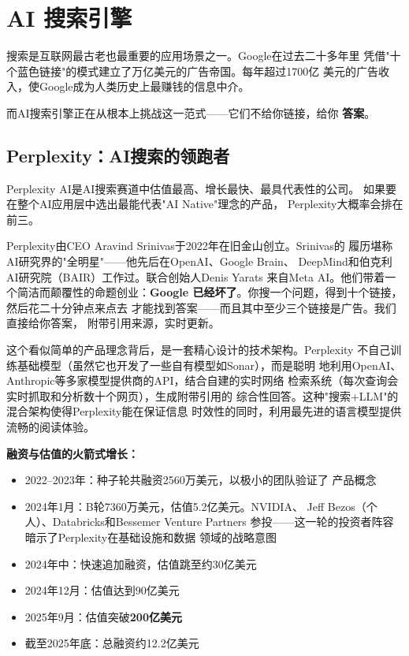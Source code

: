 \section{AI 搜索引擎}
\label{sec:social-search}

搜索是互联网最古老也最重要的应用场景之一。Google在过去二十多年里
凭借"十个蓝色链接"的模式建立了万亿美元的广告帝国。每年超过1700亿
美元的广告收入，使Google成为人类历史上最赚钱的信息中介。

而AI搜索引擎正在从根本上挑战这一范式——它们不给你链接，给你
\textbf{答案}。

\subsection{Perplexity：AI搜索的领跑者}
\label{subsec:ch09-perplexity}

Perplexity AI是AI搜索赛道中估值最高、增长最快、最具代表性的公司。
如果要在整个AI应用层中选出最能代表"AI Native"理念的产品，
Perplexity大概率会排在前三。

Perplexity由CEO Aravind Srinivas于2022年在旧金山创立。Srinivas的
履历堪称AI研究界的"全明星"——他先后在OpenAI、Google Brain、
DeepMind和伯克利AI研究院（BAIR）工作过。联合创始人Denis Yarats
来自Meta AI。他们带着一个简洁而颠覆性的命题创业：\textbf{Google
已经坏了}。你搜一个问题，得到十个链接，然后花二十分钟点来点去
才能找到答案——而且其中至少三个链接是广告。我们直接给你答案，
附带引用来源，实时更新。

这个看似简单的产品理念背后，是一套精心设计的技术架构。Perplexity
不自己训练基础模型（虽然它也开发了一些自有模型如Sonar），而是聪明
地利用OpenAI、Anthropic等多家模型提供商的API，结合自建的实时网络
检索系统（每次查询会实时抓取和分析数十个网页），生成附带引用的
综合性回答。这种"搜索+LLM"的混合架构使得Perplexity能在保证信息
时效性的同时，利用最先进的语言模型提供流畅的阅读体验。

\textbf{融资与估值的火箭式增长：}

\begin{itemize}
  \item 2022--2023年：种子轮共融资2560万美元，以极小的团队验证了
    产品概念
  \item 2024年1月：B轮7360万美元，估值5.2亿美元。NVIDIA、
    Jeff Bezos（个人）、Databricks和Bessemer Venture Partners
    参投——这一轮的投资者阵容暗示了Perplexity在基础设施和数据
    领域的战略意图
  \item 2024年中：快速追加融资，估值跳至约30亿美元
  \item 2024年12月：估值达到90亿美元
  \item 2025年9月：估值突破\textbf{200亿美元}
  \item 截至2025年底：总融资约12.2亿美元
\end{itemize}

